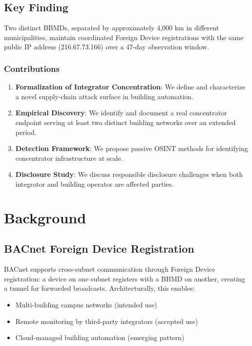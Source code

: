 \documentclass[11pt,a4paper]{article}
\begin{document}
\subsection{Key Finding}

Two distinct BBMDs, separated by approximately 4,000 km in different 
municipalities, maintain coordinated Foreign Device registrations with 
the same public IP address (216.67.73.166) over a 47-day observation 
window.

\subsubsection{Contributions}

\begin{enumerate}
  \item \textbf{Formalization of Integrator Concentration}: We define and 
    characterize a novel supply-chain attack surface in building automation.
    
  \item \textbf{Empirical Discovery}: We identify and document a real 
    concentrator endpoint serving at least two distinct building networks 
    over an extended period.
    
  \item \textbf{Detection Framework}: We propose passive OSINT methods 
    for identifying concentrator infrastructure at scale.
    
  \item \textbf{Disclosure Study}: We discuss responsible disclosure 
    challenges when both integrator and building operator are affected 
    parties.
\end{enumerate}

\section{Background}
\label{sec:background}

\subsection{BACnet Foreign Device Registration}

BACnet supports cross-subnet communication through Foreign Device 
registration: a device on one subnet registers with a BBMD on another, 
creating a tunnel for forwarded broadcasts. Architecturally, this enables:

\begin{itemize}
  \item Multi-building campus networks (intended use)
  \item Remote monitoring by third-party integrators (accepted use)
  \item Cloud-managed building automation (emerging pattern)
\end{itemize}
\end{document}
